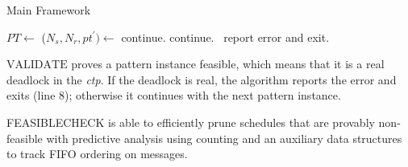 \begin{algorithm}[t]
\caption{Main Framework}\label{algo:main}
\begin{algorithmic}[1]
\State  $\mathit{PT} \gets$ 
\State ($\mathit{N_s}, \mathit{N_r}, \mathit{pt^\prime})\gets$
\State continue.
\State continue.
\Else\ report error and exit.
\EndIf

\EndFor
\end{algorithmic}
\end{algorithm}


$\mathrm{VALIDATE}$ proves a pattern instance feasible, which means that it is a real deadlock in the \emph{ctp}. If the deadlock is real, the algorithm reports the error and exits (line 8); otherwise it continues with the next pattern instance.

\textrm{FEASIBLECHECK} is able to efficiently prune schedules that are provably non-feasible with predictive analysis using counting and an auxiliary data structures to track FIFO ordering on messages. 

